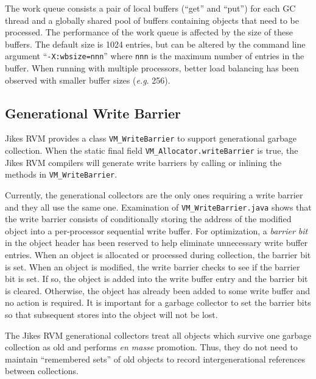 The work queue consists a pair of local buffers (``get'' and ``put'') for each GC thread
and a globally shared pool of buffers containing objects that need to be processed.  
The performance of the work queue is affected by the size of these buffers.  
The default size is 1024 entries, but can be altered by the command line argument ``{\tt -X:wbsize=nnn}'' 
where {\tt nnn} is the maximum number of entries in the buffer.  When running with multiple
processors, better load balancing has been observed with smaller buffer sizes ({\it e.g}. 256).

\subsection{Generational Write Barrier} \label{sssec:writebarrier}
Jikes RVM provides a class {\tt VM\_WriteBarrier} to support generational garbage collection.
When the static final field {\tt VM\_Allocator.writeBarrier} is true,
the Jikes RVM compilers will generate write barriers by calling or inlining the methods in
{\tt VM\_WriteBarrier}.

Currently, the generational collectors are the only ones requiring a write barrier
and they all use the same one.  Examination of {\tt VM\_WriteBarrier.java} shows
that the write barrier consists of conditionally storing the address of the modified object
into a per-processor sequential write buffer.  For optimization, a {\it barrier bit} in the object header
has been reserved to help eliminate unnecessary write buffer entries.
When an object is allocated or processed during collection, the barrier bit is set.
When an object is modified, the write barrier checks to see if the barrier bit is set.
If so, the object is added into the write buffer entry and the barrier bit is cleared.
Otherwise, the object has already been added to some write buffer and no action is required.
It is important for a garbage collector to set the barrier bits so that
subsequent stores into the object will not be lost.

The Jikes RVM generational collectors treat all objects which survive one garbage collection as old
and performs {\it en masse} promotion.  Thus, they do not need to maintain ``remembered sets''
of old objects to record intergenerational references between collections.

